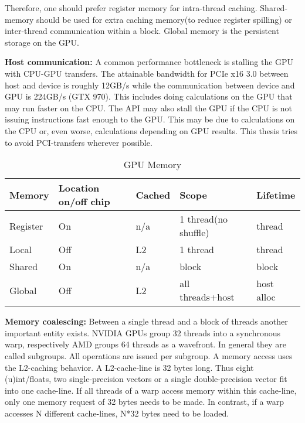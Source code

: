 \documentclass[m,times]{cgMA}
\begin{document}
Therefore, one should prefer register memory for intra-thread caching. Shared-memory should be used for extra caching memory(to reduce register spilling) or inter-thread communication within a block. Global memory is the persistent storage on the GPU.

\textbf{Host communication:} A common performance bottleneck is stalling the GPU with CPU-GPU transfers. The attainable bandwidth for PCIe x16 3.0 between host and device is roughly 12GB/s while the communication between device and GPU is 224GB/s (GTX 970). This includes doing calculations on the GPU that may run faster on the CPU. The API may also stall the GPU if the CPU is not issuing instructions fast enough to the GPU. This may be due to calculations on the CPU or, even worse, calculations depending on GPU results. This thesis tries to avoid PCI-transfers wherever possible.

\begin{table}
  \begin{tabular}{ | l | l | l | l | l |}    \hline
    Memory       &Location on/off chip   &Cached   &Scope                &Lifetime   \\\hline
    Register     &On                     &n/a      &1 thread(no shuffle) &thread     \\\hline
    Local        &Off                    &L2       &1 thread             &thread     \\\hline
    Shared       &On                     &n/a      &block                &block      \\\hline
    Global       &Off                    &L2       &all threads+host     &host alloc \\
    \hline
  \end{tabular}
\caption{GPU Memory \cite{NVIDIA:BEST:PRACTICE}}
\end{table}
\textbf{Memory coalescing:} Between a single thread and a block of threads another important entity exists. NVIDIA GPUs group 32 threads into a synchronous warp, respectively AMD groups 64 threads as a wavefront. In general they are called subgroups. All operations are issued per subgroup. A memory access uses the L2-caching behavior. A L2-cache-line is 32 bytes long. Thus eight (u)int/floats, two single-precision vectors or a single double-precision vector fit into one cache-line. If all threads of a warp access memory within this cache-line, only one memory request of 32 bytes needs to be made. In contrast, if a warp accesses N different cache-lines, N*32 bytes need to be loaded.
\end{document}
